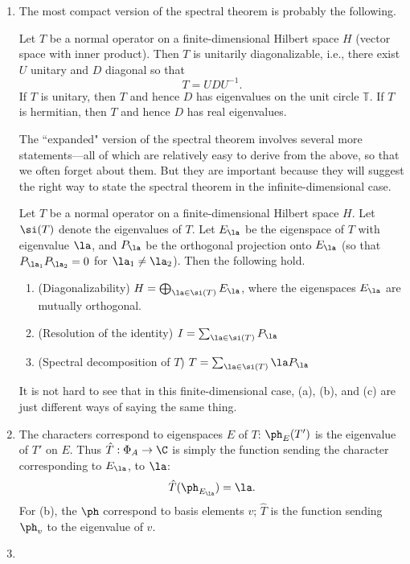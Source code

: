 \begin{enumerate}
\item
The most compact version of the spectral theorem is probably the following.
\begin{thm}
Let $T$ be a normal operator on a finite-dimensional Hilbert space $H$ (vector space with inner product). Then $T$ is unitarily diagonalizable, i.e., there exist $U$ unitary and $D$ diagonal so that
\[
T=UDU^{-1}.
\]
If $T$ is unitary, then $T$ and hence $D$ has eigenvalues on the unit circle $\mathbb T$. If $T$ is hermitian, then $T$ and hence $D$ has real eigenvalues.
\end{thm}
The ``expanded" version of the spectral theorem involves several more statements---all of which are relatively easy to derive from the above, so that we often forget about them. But they are important because they will suggest the right way to state the spectral theorem in the infinite-dimensional case.
\begin{thm}
Let $T$ be a normal operator on a finite-dimensional Hilbert space $H$. Let $\si(T)$ denote the eigenvalues of $T$. Let $E_{\la}$ be the eigenspace of $T$ with eigenvalue $\la$, and  $P_{\la}$ be the orthogonal projection onto $E_{\la}$ (so that $P_{\la_1}P_{\la_2}=0$ for $\la_1\ne \la_2$). Then the following hold.
\begin{enumerate}
\item
(Diagonalizability)
$H=\bigoplus_{\la\in \si(T)}E_{\la}$, where the eigenspaces $E_{\la}$ are mutually orthogonal.
\item
(Resolution of the identity)
$
I=\sum_{\la \in \si(T)}P_{\la}
$
\item
(Spectral decomposition of $T$)
$
T=\sum_{\la \in \si(T)}\la P_{\la}
$
\end{enumerate}
\end{thm}
It is not hard to see that in this finite-dimensional case, (a), (b), and (c) are just different ways of saying the same thing.
\item
The characters correspond to eigenspaces $E$ of $T$: $\ph_E(T')$ is the eigenvalue of $T'$ on $E$. Thus $\hat T:\Phi_A\to \C$ is simply the function sending the character corresponding to $E_{\la}$, to $\la$:
\[
\hat T(\ph_{E_{\la}})=\la.
\] 
For (b), the $\ph$ correspond to basis elements $v$; $\hat T$ is the function sending $\ph_v$ to the eigenvalue of $v$.
\item

\end{enumerate}
